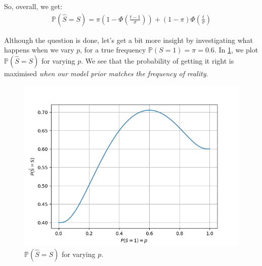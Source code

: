 So, overall, we get:
\begin{align}
\mathbb P(\hat S = S) = \pi \left(1-\Phi\left(\frac{t-1}{\sigma}\right)\right) + (1-\pi)\Phi\left(\frac{t}{\sigma}\right)
\end{align}

Although the question is done, let's get a bit more insight by investigating what happens when we vary $p$, for a true frequency $\mathbb P(S = 1) = \pi = 0.6$. In \cref{fig:elec-comm-errors-varyp}, we plot $\mathbb P(\hat S = S)$ for varying $p$. We see that the probability of getting it right is maximised \emph{when our model prior matches the frequency of reality}.

\begin{figure}[h]
\label{fig:elec-comm-errors-varyp}
\centering
\includegraphics[width=0.8\linewidth]{elec-decoding-errors.png}
\caption{$\mathbb P(\hat S = S)$ for varying $p$.}
\end{figure}
